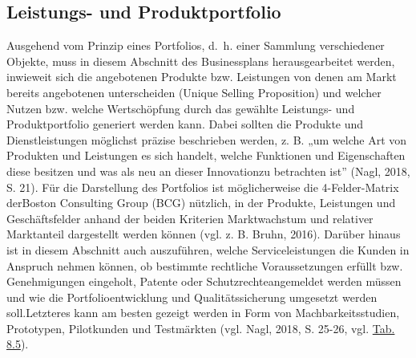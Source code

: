 \documentclass[
  letterpaper,
]{book}
\begin{document}
\subsection{Leistungs- und
Produktportfolio}\label{leistungs-und-produktportfolio}

Ausgehend vom Prinzip eines Portfolios, d.~h. einer Sammlung
verschiedener Objekte, muss in diesem Abschnitt des Businessplans
herausgearbeitet werden, inwieweit sich die angebotenen Produkte bzw.
Leistungen von denen am Markt bereits angebotenen unterscheiden (Unique
Selling Proposition) und welcher Nutzen bzw. welche Wertschöpfung durch
das gewählte Leistungs- und Produktportfolio generiert werden kann.
Dabei sollten die Produkte und Dienstleistungen möglichst präzise
beschrieben werden, z. B. „um welche Art von Produkten und Leistungen es
sich handelt, welche Funktionen und Eigenschaften diese besitzen und was
als neu an dieser Innovationzu betrachten ist'' (Nagl, 2018, S. 21). Für
die Darstellung des Portfolios ist möglicherweise die 4-Felder-Matrix
derBoston Consulting Group (BCG) nützlich, in der Produkte, Leistungen
und Geschäftsfelder anhand der beiden Kriterien Marktwachstum und
relativer Marktanteil dargestellt werden können (vgl. z. B. Bruhn,
2016). Darüber hinaus ist in diesem Abschnitt auch auszuführen, welche
Serviceleistungen die Kunden in Anspruch nehmen können, ob bestimmte
rechtliche Voraussetzungen erfüllt bzw. Genehmigungen eingeholt, Patente
oder Schutzrechteangemeldet werden müssen und wie die
Portfolioentwicklung und Qualitätssicherung umgesetzt werden
soll.Letzteres kann am besten gezeigt werden in Form von
Machbarkeitsstudien, Prototypen, Pilotkunden und Testmärkten (vgl. Nagl,
2018, S. 25-26, vgl. \hyperref[table85]{Tab. 8.5}).
\end{document}
